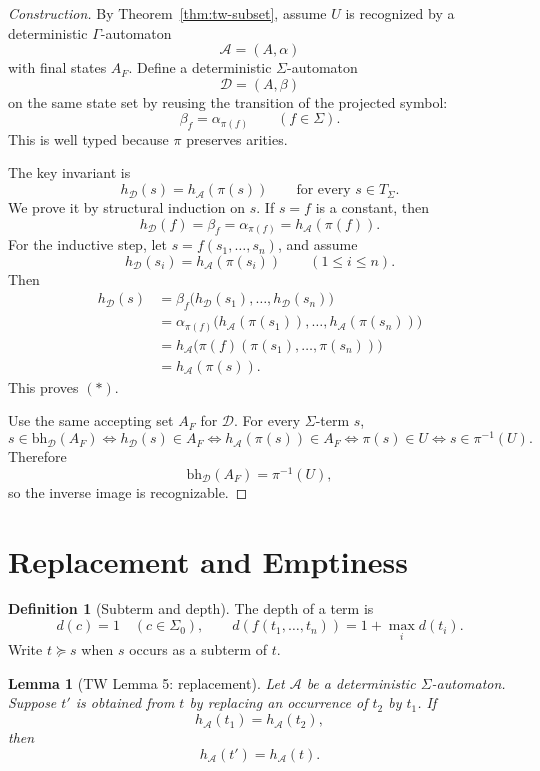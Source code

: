 \documentclass[11pt]{article}
\newtheorem{lemma}[theorem]{Lemma}
\theoremstyle{definition}
\newtheorem{definition}[theorem]{Definition}
\newcommand{\SigmaSym}{\Sigma}
\newcommand{\Term}[1]{T_{#1}}
\newcommand{\Aut}{\mathcal A}
\newcommand{\bh}{\mathrm{bh}}
\begin{document}
\begin{proof}[Construction]
By Theorem~\ref{thm:tw-subset}, assume \(U\) is recognized by a deterministic
\(\Gamma\)-automaton
\[
  \Aut=(A,\alpha)
\]
with final states \(A_F\).  Define a deterministic \(\SigmaSym\)-automaton
\[
  \mathcal D=(A,\beta)
\]
on the same state set by reusing the transition of the projected symbol:
\[
  \beta_f=\alpha_{\pi(f)}
  \qquad (f\in\SigmaSym).
\]
This is well typed because \(\pi\) preserves arities.

The key invariant is
\[
  h_{\mathcal D}(s)=h_\Aut(\pi(s))
  \qquad\text{for every }s\in\Term{\SigmaSym}.       \tag{\(*\)}
\]
We prove it by structural induction on \(s\).  If \(s=f\) is a constant, then
\[
  h_{\mathcal D}(f)
  =
  \beta_f
  =
  \alpha_{\pi(f)}
  =
  h_\Aut(\pi(f)).
\]
For the inductive step, let \(s=f(s_1,\ldots,s_n)\), and assume
\[
  h_{\mathcal D}(s_i)=h_\Aut(\pi(s_i))
  \qquad (1\le i\le n).
\]
Then
\begin{align*}
  h_{\mathcal D}(s)
  &=
  \beta_f\bigl(h_{\mathcal D}(s_1),\ldots,h_{\mathcal D}(s_n)\bigr) \\
  &=
  \alpha_{\pi(f)}
    \bigl(h_\Aut(\pi(s_1)),\ldots,h_\Aut(\pi(s_n))\bigr) \\
  &=
  h_\Aut\bigl(\pi(f)(\pi(s_1),\ldots,\pi(s_n))\bigr) \\
  &=
  h_\Aut(\pi(s)).
\end{align*}
This proves \((*)\).

Use the same accepting set \(A_F\) for \(\mathcal D\).  For every
\(\SigmaSym\)-term \(s\),
\[
  s\in\bh_{\mathcal D}(A_F)
  \Longleftrightarrow
  h_{\mathcal D}(s)\in A_F
  \Longleftrightarrow
  h_\Aut(\pi(s))\in A_F
  \Longleftrightarrow
  \pi(s)\in U
  \Longleftrightarrow
  s\in\pi^{-1}(U).
\]
Therefore
\[
  \bh_{\mathcal D}(A_F)=\pi^{-1}(U),
\]
so the inverse image is recognizable.
\end{proof}

\section{Replacement and Emptiness}

\begin{definition}[Subterm and depth]
The depth of a term is
\[
  d(c)=1 \quad(c\in\SigmaSym_0), \qquad
  d(f(t_1,\ldots,t_n))=1+\max_i d(t_i).
\]
Write \(t\succeq s\) when \(s\) occurs as a subterm of \(t\).
\end{definition}

\begin{lemma}[TW Lemma 5: replacement]\label{lem:tw-replacement}
Let \(\Aut\) be a deterministic \(\SigmaSym\)-automaton.  Suppose \(t'\) is
obtained from \(t\) by replacing an occurrence of \(t_2\) by \(t_1\).  If
\[
  h_\Aut(t_1)=h_\Aut(t_2),
\]
then
\[
  h_\Aut(t')=h_\Aut(t).
\]
\end{lemma}
\end{document}

